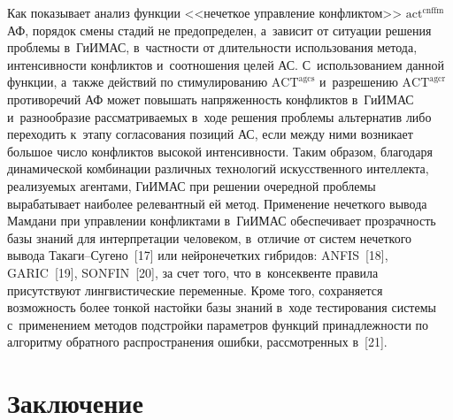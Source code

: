 \begin{multicols}{2}
  Как показывает анализ функции <<нечеткое управление конфликтом>> 
$\mathrm{act}^{\mathrm{cnffm}}$ АФ, порядок смены стадий не предопределен, 
а~зависит от ситуации решения проблемы в~\mbox{ГиИМАС}, в~част\-ности от 
длительности использования метода, интенсивности конфликтов 
и~соотношения целей АС. С~использованием данной функции, а~также 
действий по стимулированию $\mathrm{ACT}^{\mathrm{agcs}}$ и~разрешению 
$\mathrm{ACT}^{\mathrm{agcr}}$ противоречий АФ может повышать напряженность 
конфликтов в~\mbox{ГиИМАС} и~разнообразие рассматриваемых в~ходе 
решения проблемы альтернатив либо переходить к~этапу согласования 
позиций АС, если между ними возникает большое число конфликтов высокой 
интенсивности. Таким образом, благодаря динамической комбинации 
различных технологий искусственного интеллекта, реа\-ли\-зу\-емых агентами, 
\mbox{ГиИМАС} при решении очередной проб\-ле\-мы вырабатывает наиболее 
релевантный ей метод. Применение нечеткого вывода Мамдани при управ\-ле\-нии 
конфликтами в~\mbox{ГиИМАС} обеспечивает прозрачность базы знаний для 
интерпретации человеком, в~отличие от систем нечеткого вывода  
Та\-ка\-ги--Су\-ге\-но~[17] или нейронечетких гибридов: ANFIS~[18], 
GARIC~[19], SONFIN~[20], за счет того, что в~консеквенте правила 
присутствуют лингвистические переменные. Кроме того, сохраняется 
возможность более тонкой настойки базы знаний в~ходе тестирования  
сис\-те\-мы с~применением методов подстройки параметров функций 
принадлежности по алгоритму обратного распространения ошибки,  
рас\-смот\-рен\-ных в~[21].

\section{Заключение}


\end{multicols}
